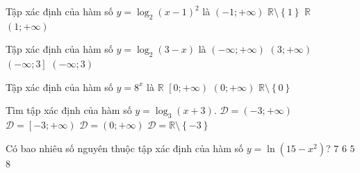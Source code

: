 

\begin{ex}%
	Tập xác  định của hàm số $y=\log_2(x-1)^2$ là
	 \choice
		 {$(-1;+\infty)$}
		{\True  $\mathbb{R}\setminus \left\{1\right\}$}
		{$\mathbb{R}$} 
		 {$(1;+\infty)$}
\end{ex}

\begin{ex}%
	Tập xác định của  hàm số $y=\log_2(3-x)$ là
	\choice 
		{$(-\infty;+\infty)$} 
		 {$(3;+\infty)$}
		{$\left(-\infty;3\right]$} 
		 {\True $(-\infty;3)$}
\end{ex}

\begin{ex}%
	Tập xác định  của hàm số $y=8^x$ là
	\choice 
		{\True  $\mathbb{R}$}
		{$\left[0;+\infty\right)$} 
		{$(0;+\infty)$} 
		{$\mathbb{R}\setminus  \left\{0\right\}$}
\end{ex}

\begin{ex}%
	Tìm tập xác định của  hàm số $y=\log_3(x+3)$.
	 \choice
		{\True $\mathscr{D}=(-3;+\infty)$} 
		 {$\mathscr{D}=\left[-3;+\infty\right)$}
		{$\mathscr{D}=(0;+\infty)$} 
		{$\mathscr{D}=\mathbb{R}\setminus  \left\{-3\right\}$}
\end{ex}

\begin{ex}%
	Có  bao nhiêu số nguyên thuộc tập xác định của hàm số $y=\ln (15-x^2)$?
	\choice 
		 {\True $7$}
		 {$6$}
		 {$5$}
		 {$8$}
\end{ex}

